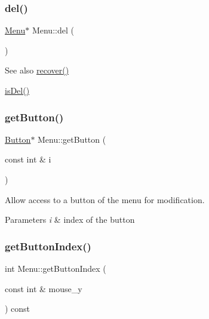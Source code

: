 \subsubsection{\texorpdfstring{del()}{del()}}
{\footnotesize\ttfamily \mbox{\hyperlink{class_menu}{Menu}}$\ast$ Menu\+::del (\begin{DoxyParamCaption}{ }\end{DoxyParamCaption})\hspace{0.3cm}{\ttfamily [inline]}}

\begin{DoxySeeAlso}{See also}
\mbox{\hyperlink{class_menu_a75a1e9e303a0d8398b6cfc498a92ed48}{recover()}} 

\mbox{\hyperlink{class_menu_a8dd5bf7c984e940e18688fc2d21a7697}{is\+Del()}} 
\end{DoxySeeAlso}
\mbox{\label{class_menu_a3893d4b249adaadbbaf01501a1410154}} 
\subsubsection{\texorpdfstring{get\+Button()}{getButton()}}
{\footnotesize\ttfamily \mbox{\hyperlink{class_button}{Button}}$\ast$ Menu\+::get\+Button (\begin{DoxyParamCaption}\item[{const int \&}]{i }\end{DoxyParamCaption})\hspace{0.3cm}{\ttfamily [inline]}}



Allow access to a button of the menu for modification. 


\begin{DoxyParams}{Parameters}
{\em i} & index of the button \\
\hline
\end{DoxyParams}
\mbox{\label{class_menu_a83b3fc6786188f496f87658e099f2371}} 
\subsubsection{\texorpdfstring{get\+Button\+Index()}{getButtonIndex()}}
{\footnotesize\ttfamily int Menu\+::get\+Button\+Index (\begin{DoxyParamCaption}\item[{const int \&}]{mouse\+\_\+y }\end{DoxyParamCaption}) const\hspace{0.3cm}{\ttfamily [inline]}}



